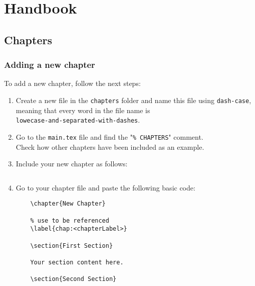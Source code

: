 \chapter{Handbook}
\label{chap:handbook}
 
\section{Chapters}

\subsection{Adding a new chapter}

To add a new chapter, follow the next steps:

\begin{enumerate}
  \item Create a new file in the \verb|chapters| folder and name this file using \verb|dash-case|, meaning that every word in the file name is\\\verb|lowecase-and-separated-with-dashes|.
  \item Go to the \verb|main.tex| file and find the "\verb|% CHAPTERS|" comment.\\Check how other chapters have been included as an example.
  \item Include your new chapter as follows:
  \begin{lstlisting}
    \end{lstlisting}
  \item Go to your chapter file and paste the following basic code:
  \begin{lstlisting}
    \chapter{New Chapter}

    % use to be referenced
    \label{chap:<chapterLabel>}
 
    \section{First Section}
    
    Your section content here.
    
    \section{Second Section}
    

\end{lstlisting}
\end{enumerate}
